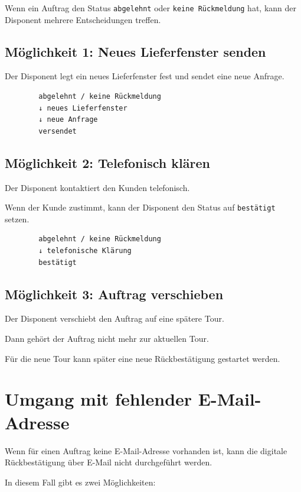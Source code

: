 \documentclass[12pt,a4paper]{article}
\begin{document}
	Wenn ein Auftrag den Status \texttt{abgelehnt} oder \texttt{keine Rückmeldung} hat, kann der Disponent mehrere Entscheidungen treffen.
	
	\subsection{Möglichkeit 1: Neues Lieferfenster senden}
	
	Der Disponent legt ein neues Lieferfenster fest und sendet eine neue Anfrage.
	
	\begin{lstlisting}
		abgelehnt / keine Rückmeldung
		↓ neues Lieferfenster
		↓ neue Anfrage
		versendet
	\end{lstlisting}
	
	\subsection{Möglichkeit 2: Telefonisch klären}
	
	Der Disponent kontaktiert den Kunden telefonisch.
	
	Wenn der Kunde zustimmt, kann der Disponent den Status auf \texttt{bestätigt} setzen.
	
	\begin{lstlisting}
		abgelehnt / keine Rückmeldung
		↓ telefonische Klärung
		bestätigt
	\end{lstlisting}
	
	\subsection{Möglichkeit 3: Auftrag verschieben}
	
	Der Disponent verschiebt den Auftrag auf eine spätere Tour.
	
	Dann gehört der Auftrag nicht mehr zur aktuellen Tour.
	
	Für die neue Tour kann später eine neue Rückbestätigung gestartet werden.
	
	\section{Umgang mit fehlender E-Mail-Adresse}
	
	Wenn für einen Auftrag keine E-Mail-Adresse vorhanden ist, kann die digitale Rückbestätigung über E-Mail nicht durchgeführt werden.
	
	In diesem Fall gibt es zwei Möglichkeiten:
	
\end{document}

